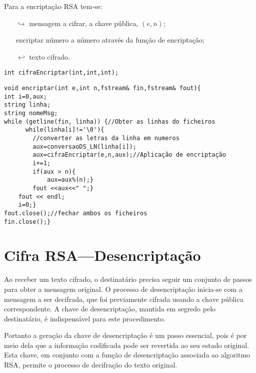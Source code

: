 Para a encriptação RSA tem-se:

\begin{itemize}
    \item[$\hookrightarrow$] mensagem a cifrar, a chave pública, $(e,n)$;
    \item[] encriptar número a número através da função de encriptação;
    \item [$\hookleftarrow$] texto cifrado.
\end{itemize}

\begin{lstlisting}[frame=single,mathescape=true,caption={Cifra RSA ---Especificação de \texttt{CifraEncriptar}},captionpos=b,label={lst:rsaCifraEncriptar},basicstyle=\footnotesize]
int cifraEncriptar(int,int,int);
\end{lstlisting}

\begin{lstlisting}[frame=single,mathescape=true,caption={Encriptação RSA},captionpos=b,label={lst:EncriptacaoRSA},basicstyle=\footnotesize]
void encriptar(int e,int n,fstream& fin,fstream& fout){
int i=0,aux;
string linha;
string nomeMsg;
while (getline(fin, linha)) {//Obter as linhas do ficheiros
      while(linha[i]!='\0'){
        //converter as letras da linha em numeros
        aux=conversaoDS_LN(linha[i]);
        aux=cifraEncriptar(e,n,aux);//Aplicação de encriptação
        i+=1;
        if(aux > n){
            aux=aux%(n);}
        fout <<aux<<" ";}
    fout << endl;
    i=0;}
fout.close();//fechar ambos os ficheiros
fin.close();}

\end{lstlisting}

\section{Cifra RSA---Desencriptação}
\label{ec:cifraRSAdesencriptacao}


Ao receber um texto cifrado, o destinatário precisa seguir um conjunto de passos para obter a mensagem original. O processo de desencriptação inicia-se com a mensagem a ser decifrada, que foi previamente cifrada usando a chave pública correspondente. A chave de desencriptação, mantida em segredo pelo destinatário, é indispensável para este procedimento.

Portanto a geração da chave de desencriptação é um passo essencial, pois é por meio dela que a informação codificada pode ser revertida ao seu estado original. Esta chave, em conjunto com a função de desencriptação associada ao algoritmo RSA, permite o processo de decifração do texto original.

